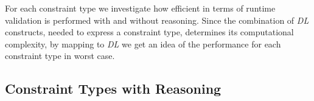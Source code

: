 \documentclass{acm_proc_article-sp}
\newcommand{\ms}[1]{%
  \texttt{#1}
}
\newcommand{\tb}[1]{\todo[size=\small, color=green!40]{\textbf{Thomas:} #1}}
\newcommand{\er}[1]{\todo[size=\small, color=red!40]{\textbf{Erman:} #1}}
\begin{document}

For each constraint type we investigate how efficient in terms of runtime validation is performed with and without reasoning.
Since the combination of \emph{DL} constructs, needed to express a constraint type, determines its computational complexity, 
by mapping to \emph{DL} we get an idea of the performance for each constraint type in worst case.

\subsection{Constraint Types with Reasoning}
\label{sec:RDF-validation-requirements-and-reasoning}
\end{document}

